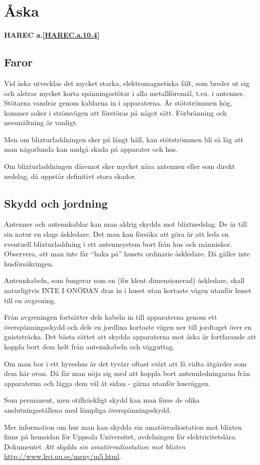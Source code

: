 \section{Åska}
\textbf{
HAREC a.\ref{HAREC.a.10.4}\label{myHAREC.a.10.4}
}

\subsection{Faror}

Vid åska utvecklas det mycket starka, elektromagnetiska fält, som
breder ut sig och alstrar mycket korta spänningsstötar i alla
metallföremål, t.ex. i antenner. Stötarna vandrar genom kablarna in i
apparaterna. Är stötströmmen hög, kommer saker i strömvägen att förstöras
på något sätt.  Förbränning och nersmältning är vanligt.

Men om blixturladdningen sker på långt håll, kan stötströmmen bli så låg att
man någorlunda kan undgå skada på apparater och hus.

Om blixturladdningen däremot sker mycket nära antennen eller som direkt nedslag,
då uppstår definitivt stora skador.

\subsection{Skydd och jordning}

Antenner och antennkablar kan man aldrig skydda mot blixtnedslag. De är 
till sin natur en slags åskledare. Det man kan försöka att göra är
att leda en eventuell blixturladdning i ett antennsystem bort från hus
och människor. Observera, att man inte får ``haka på'' husets
ordinarie åskledare. Då gäller inte husförsäkringen.

Antennkabeln, som fungerar som en (för klent dimensionerad) åskledare,
skall naturligtvis INTE I ONÖDAN dras in i huset utan kortaste vägen
utanför huset till en avgrening.

Från avgreningen fortsätter dels kabeln in till apparaterna genom ett
överspänningsskydd och dels en jordlina kortaste vägen ner till
jordtaget över en gniststräcka. Det bästa sättet att skydda
apparaterna mot åska är fortfarande att koppla bort dem helt från
antennkabeln och vägguttag.

Om man bor i ett hyreshus är det tyvärr oftast svårt att få vidta
åtgärder som dem här ovan. Då får man nöja sig med att koppla
bort antennledningarna från apparaterna och lägga dem väl åt sidan -
gärna utanför husväggen.

Som permanent, men otillräckligt skydd kan man förse de olika
anslutningsställena med lämpliga överspänningsskydd.

Mer information om hur man kan skydda sin amatörradiostation mot blixten
finns på hemsidan för Uppsala Universitet, avdelningen för elektricitetslära.
Dokumentet \emph{Att skydda sin amatörradiostation mot blixten}
\url{http://www.hvi.uu.se/meny/m5.html}.
